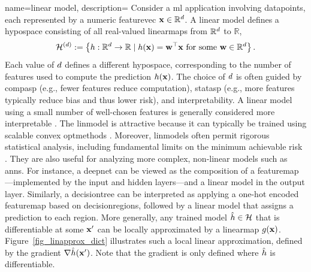 {name={linear model}, 
	description={
		Consider a \gls{ml} application involving \glspl{datapoint}, each represented 
		by a numeric \gls{featurevec} ${\bf x} \in \mathbb{R}^{d}$. A linear \gls{model} defines 
		a \gls{hypospace} consisting of all real-valued \glspl{linearmap} from $\mathbb{R}^{d}$ to $\mathbb{R}$,
		\begin{equation}
			\label{equ_def_lin_model_hypspace_dict}
			\mathcal{H}^{(d)} := \left\{ h: \mathbb{R}^{d} \rightarrow \mathbb{R} \mid h({\bf x}) = {\bf w}^{\top} {\bf x} \text{ for some } {\bf w} \in \mathbb{R}^{d} \right\}.
		\end{equation}
		Each value of $d$ defines a different \gls{hypospace}, corresponding to the number of 
		\glspl{feature} used to compute the \gls{prediction} $h({\bf x})$. The choice of 
		$d$ is often guided by \gls{compasp} (e.g., fewer features reduce computation), \gls{statasp} 
		(e.g., more features typically reduce \gls{bias} and thus lower \gls{risk}), and \gls{interpretability}. 
		A linear \gls{model} using a small number of well-chosen \glspl{feature} is generally considered 
		more interpretable \cite{rudin2019stop, Ribeiro2016}.
		The \gls{linmodel} is attractive because it can typically be trained using scalable \gls{convex} \glspl{optmethod} \cite{hastie01statisticallearning,BertsekasNonLinProgr}. Moreover, \glspl{linmodel} often permit rigorous 
		statistical analysis, including fundamental limits on the minimum achievable \gls{risk} \cite{Wain2019}. 
		They are also useful for analyzing more complex, non-linear \glspl{model} such as \glspl{ann}. For instance, 
		a \gls{deepnet} can be viewed as the composition of a \gls{featuremap}---implemented by the input and 
		hidden layers---and a linear \gls{model} in the output layer. Similarly, a \gls{decisiontree} can be interpreted 
		as applying a one-hot encoded \gls{featuremap} based on \glspl{decisionregion}, followed by a linear 
		\gls{model} that assigns a \gls{prediction} to each region.
		More generally, any trained \gls{model} $\hat{h} \in \mathcal{H}$ that is 
		\gls{differentiable} at some ${\bf x}'$ can be locally approximated by a \gls{linearmap} 
		$g({\bf x})$. Figure~\ref{fig_linapprox_dict} illustrates such a local linear approximation, 
		defined by the \gls{gradient} $\nabla \hat{h}({\bf x}')$. Note that the \gls{gradient} 
		is only defined where $\hat{h}$ is \gls{differentiable}.
}}
